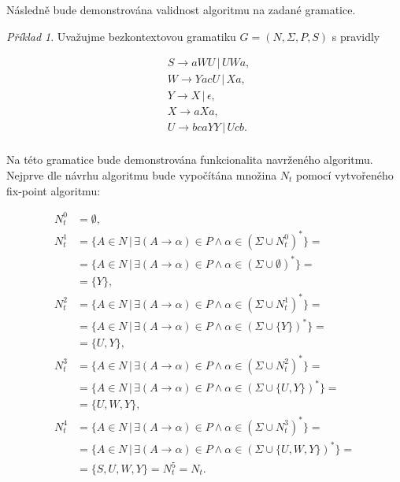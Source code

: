 \documentclass[a4paper, 12pt]{article}
\theoremstyle{definition}
\theoremstyle{definition}
\theoremstyle{definition}
\theoremstyle{remark}
\newtheorem{example}{Příklad}[section]
\begin{document}
Následně bude demonstrována validnost algoritmu na zadané gramatice.

\begin{example}
    Uvažujme bezkontextovou gramatiku $G = (N, \Sigma, P, S)$ s pravidly

    \begin{align*}
    &S \rightarrow aWU \, | \, UWa, \\
    &W \rightarrow YacU \, | \, Xa,  \\ 
    &Y \rightarrow X \, | \, \epsilon, \\
    &X \rightarrow aXa, \\
    &U \rightarrow bcaYY \, | \, Ucb. \\
    \end{align*}

Na této gramatice bude demonstrována funkcionalita navrženého algoritmu. Nejprve dle návrhu algoritmu bude vypočítána množina $N_t$ pomocí vytvořeného fix-point algoritmu:

\begin{align*}
    N_t^0 &= \emptyset,\\
    N_t^1 &= \{A \in N \, | \, \exists (A \rightarrow \alpha) \in P \wedge \alpha \in (\Sigma \cup N_t^0)^\ast\} = \\
          &= \{A \in N \, | \, \exists (A \rightarrow \alpha) \in P \wedge \alpha \in (\Sigma \cup \emptyset)^\ast\} = \\
          &= \{Y\}, \\
    N_t^2 &= \{A \in N \, | \, \exists (A \rightarrow \alpha) \in P \wedge \alpha \in (\Sigma \cup N_t^1)^\ast\} = \\
          &= \{A \in N \, | \, \exists (A \rightarrow \alpha) \in P \wedge \alpha \in (\Sigma \cup \{Y\})^\ast\} = \\
          &= \{U, Y\}, \\
    N_t^3 &= \{A \in N \, | \, \exists (A \rightarrow \alpha) \in P \wedge \alpha \in (\Sigma \cup N_t^2)^\ast\} = \\
          &= \{A \in N \, | \, \exists (A \rightarrow \alpha) \in P \wedge \alpha \in (\Sigma \cup \{U, Y\})^\ast\} = \\
          &= \{U, W, Y\}, \\
    N_t^4 &= \{A \in N \, | \, \exists (A \rightarrow \alpha) \in P \wedge \alpha \in (\Sigma \cup N_t^3)^\ast\} = \\
          &= \{A \in N \, | \, \exists (A \rightarrow \alpha) \in P \wedge \alpha \in (\Sigma \cup \{U, W, Y\})^\ast\} = \\
          &= \{S, U, W, Y\} = N_t^5 = N_t. \\          
\end{align*}


\end{example}
\end{document}
